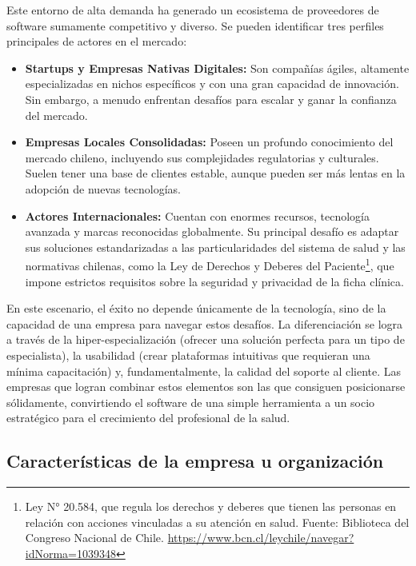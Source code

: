 Este entorno de alta demanda ha generado un ecosistema de proveedores de software sumamente competitivo y diverso. Se pueden identificar tres perfiles principales de actores en el mercado:

\begin{itemize}
    \item \textbf{Startups y Empresas Nativas Digitales:} Son compañías ágiles, altamente especializadas en nichos específicos y con una gran capacidad de innovación. Sin embargo, a menudo enfrentan desafíos para escalar y ganar la confianza del mercado.
    
    \item \textbf{Empresas Locales Consolidadas:} Poseen un profundo conocimiento del mercado chileno, incluyendo sus complejidades regulatorias y culturales. Suelen tener una base de clientes estable, aunque pueden ser más lentas en la adopción de nuevas tecnologías.
    
    \item \textbf{Actores Internacionales:} Cuentan con enormes recursos, tecnología avanzada y marcas reconocidas globalmente. Su principal desafío es adaptar sus soluciones estandarizadas a las particularidades del sistema de salud y las normativas chilenas, como la Ley de Derechos y Deberes del Paciente\footnote{Ley N° 20.584, que regula los derechos y deberes que tienen las personas en relación con acciones vinculadas a su atención en salud. Fuente: Biblioteca del Congreso Nacional de Chile. \url{https://www.bcn.cl/leychile/navegar?idNorma=1039348}}, que impone estrictos requisitos sobre la seguridad y privacidad de la ficha clínica.
\end{itemize}

En este escenario, el éxito no depende únicamente de la tecnología, sino de la capacidad de una empresa para navegar estos desafíos. La diferenciación se logra a través de la hiper-especialización (ofrecer una solución perfecta para un tipo de especialista), la usabilidad (crear plataformas intuitivas que requieran una mínima capacitación) y, fundamentalmente, la calidad del soporte al cliente. Las empresas que logran combinar estos elementos son las que consiguen posicionarse sólidamente, convirtiendo el software de una simple herramienta a un socio estratégico para el crecimiento del profesional de la salud.

\subsection{Características de la empresa u organización}

